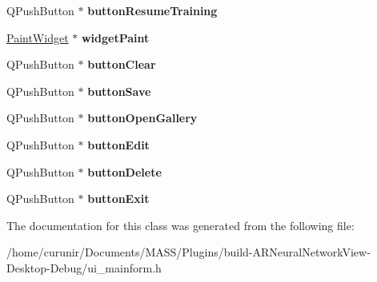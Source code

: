 \begin{DoxyCompactItemize}
\item 
Q\+Push\+Button $\ast$ {\bfseries button\+Resume\+Training}\hypertarget{class_ui___main_form_ad61611b67b0ecaf5fba88cd8302fa3f4}{}\label{class_ui___main_form_ad61611b67b0ecaf5fba88cd8302fa3f4}

\item 
\hyperlink{class_paint_widget}{Paint\+Widget} $\ast$ {\bfseries widget\+Paint}\hypertarget{class_ui___main_form_ad5f21f92ee175af2cb2251313e0f8441}{}\label{class_ui___main_form_ad5f21f92ee175af2cb2251313e0f8441}

\item 
Q\+Push\+Button $\ast$ {\bfseries button\+Clear}\hypertarget{class_ui___main_form_a130b577aef64272cdd63fe4ded47c553}{}\label{class_ui___main_form_a130b577aef64272cdd63fe4ded47c553}

\item 
Q\+Push\+Button $\ast$ {\bfseries button\+Save}\hypertarget{class_ui___main_form_a8aa11edd7d2a9402c7a5d56f473157fd}{}\label{class_ui___main_form_a8aa11edd7d2a9402c7a5d56f473157fd}

\item 
Q\+Push\+Button $\ast$ {\bfseries button\+Open\+Gallery}\hypertarget{class_ui___main_form_a953bf473c15c8703bae3e779d9b75e23}{}\label{class_ui___main_form_a953bf473c15c8703bae3e779d9b75e23}

\item 
Q\+Push\+Button $\ast$ {\bfseries button\+Edit}\hypertarget{class_ui___main_form_a7a66f0fc30f4ac5ae2ad03c9b9eb0726}{}\label{class_ui___main_form_a7a66f0fc30f4ac5ae2ad03c9b9eb0726}

\item 
Q\+Push\+Button $\ast$ {\bfseries button\+Delete}\hypertarget{class_ui___main_form_a1d8cd63247863156083819f2cfd18ce1}{}\label{class_ui___main_form_a1d8cd63247863156083819f2cfd18ce1}

\item 
Q\+Push\+Button $\ast$ {\bfseries button\+Exit}\hypertarget{class_ui___main_form_afbec44e91b63d7971a47b691b91554cc}{}\label{class_ui___main_form_afbec44e91b63d7971a47b691b91554cc}

\end{DoxyCompactItemize}


The documentation for this class was generated from the following file\+:\begin{DoxyCompactItemize}
\item 
/home/curunir/\+Documents/\+M\+A\+S\+S/\+Plugins/build-\/\+A\+R\+Neural\+Network\+View-\/\+Desktop-\/\+Debug/ui\+\_\+mainform.\+h\end{DoxyCompactItemize}
